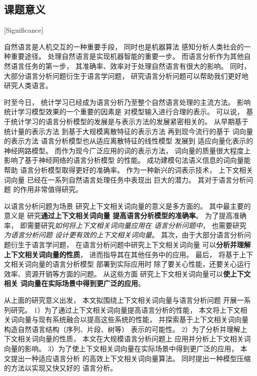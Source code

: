 \subsection{课题意义}[Significance]

自然语言是人机交互的一种重要手段，
同时也是机器算法
感知分析人类社会的一种重要途径。
处理自然语言是实现机器智能的重要一步。
而语言分析作为其他自然语言任务的第一步，
其准确率、效率对于处理自然语言有很大的影响。
同时，
大部分语言分析问题衍生于语言学问题，
研究语言分析问题可以帮助我们更好地研究人类语言。

时至今日，
统计学习已经成为语言分析乃至整个自然语言处理的主流方法。
影响统计学习模型效果的一个重要的因素是
对模型输入进行合理的表示。
可以说，
基于统计学习的语言分析模型的发展是与表示方法的发展紧密相关的。
从早期基于统计量的表示方法\cite{Brown:1992:CNG:176313.176316,Brown:1993:MSM:972470.972474,Vogel:1996:HWA:993268.993313,eisner-1996-coling}
到基于大规模离散特征的表示方法\cite{collins:2002:EMNLP02,mcdonald2006online,daume05search,zhang-clark:cl:2011}
再到现今流行的基于
词向量的表示方法\cite{NIPS2013_5021,DBLP:journals/corr/HuangXY15,kim-rush:2016:EMNLP2016}
语言分析模型也从适应离散特征的线性模型\cite{NIPS2003_2397,Crammer:2006:OPA:1248547.1248566}
发展到
适应向量化表示的神经网路模型\cite{hubel:monkey,Hochreiter:1997:LSM:1246443.1246450,Collobert:2011:NLP:1953048.2078186}。
而作为现今广泛应用的词的表示方法，
词向量的质量很大程度上影响了基于神经网络的语言分析模型
的性能。\cite{faruqui-EtAl:2016:RepEval,7478417,schnabel-EtAl:2015:EMNLP}
成功建模句法语义信息的词向量能帮助
语言分析模型取得更好的准确率。
作为一种新兴的词表示技术，
上下文相关词向量
已经在一系列自然语言处理任务中表现出
巨大的潜力。
其对于语言分析问题
的作用非常值得研究。

以语言分析问题为场景
研究上下文相关词向量的意义是多方面的。
其中最主要的意义是
研究\textbf{通过上下文相关词向量
提高语言分析模型的准确率}。
为了提高准确率，
即需要研究\textit{如何将上下文相关词向量应用在
语言分析问题中}，
也需要研究\textit{为语言分析问题
设计更有效的上下文相关词向量}。
其次，由于大部分语言分析问题衍生于语言学问题，
在语言分析问题中研究上下文相关词向量
可以\textbf{分析并理解上下文相关词向量的性质}，
进而指导其在其他任务中的应用。
最后，
将基于上下文相关词向量的语言分析模型
部署到实际应用时
除了要关心性能，还要关心运行效率、资源开销等方面的问题。
从这些方面
研究上下文相关词向量可以\textbf{使上下文相关
词向量在实际场景中得到更广泛的应用}。

从上面的研究意义出发，
本文拟围绕上下文相关词向量与语言分析问题
开展一系列研究。
1）为了通过上下文相关词向量提高语言分析的性能，
本文将上下文相关词向量与现有系统融合以提高这些系统的性能，
并探索基于上下文相关词向量构造自然语言结构（序列、片段、树等）
表示的可能性。
2）为了分析并理解上下文相关词向量的性质，
本文在大规模语言分析问题上
应用并分析上下文相关词向量的影响。
3）为了使上下文相关词向量在实际场景中得到更广泛的应用，
本文提出一种适应语言分析
的高效上下文相关词向量算法。
同时提出一种模型压缩的方法以实现又快又好的
语言分析。


